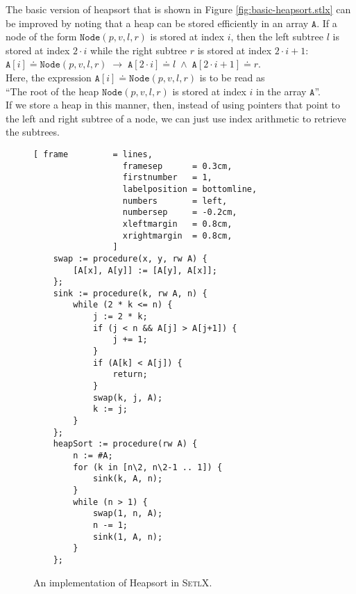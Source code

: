 The basic version of heapsort that is shown in Figure \ref{fig:basic-heapsort.stlx} can be improved
by noting that a heap can be stored efficiently in an array $\texttt{A}$.  If a node of the form
$\texttt{Node}(p, v, l, r)$ is stored at index $i$, then the left subtree $l$ is stored at
index $2 \cdot i$ while the right subtree $r$ is stored at index $2 \cdot i + 1$:
\\[0.2cm]
\hspace*{1.3cm}
$\texttt{A}[i] \doteq \texttt{Node}(p, v, l, r) \;\rightarrow\; \texttt{A}[2\cdot i] \doteq l \;\wedge\; \texttt{A}[2\cdot i+1] \doteq r$.
\\[0.2cm]
Here, the expression $\texttt{A}[i] \doteq \texttt{Node}(p, v, l, r)$ is to be read as 
\\[0.2cm]
\hspace*{1.3cm}
``The root of the heap $\texttt{Node}(p, v, l, r)$ is stored at index $i$ in the array $\texttt{A}$''.
\\[0.2cm]
If we store a heap in this manner, then, instead of using pointers that point to the left and right
subtree of a node, we can just use index arithmetic to retrieve the subtrees.  


 
\begin{figure}[!ht]
\centering
\begin{Verbatim}[ frame         = lines, 
                  framesep      = 0.3cm, 
                  firstnumber   = 1,
                  labelposition = bottomline,
                  numbers       = left,
                  numbersep     = -0.2cm,
                  xleftmargin   = 0.8cm,
                  xrightmargin  = 0.8cm,
                ]
    swap := procedure(x, y, rw A) {
        [A[x], A[y]] := [A[y], A[x]];
    };
    sink := procedure(k, rw A, n) {
        while (2 * k <= n) {
            j := 2 * k;
            if (j < n && A[j] > A[j+1]) {
                j += 1;
            }
            if (A[k] < A[j]) {
                return;
            }
            swap(k, j, A);
            k := j;
        }
    };
    heapSort := procedure(rw A) {
        n := #A;
        for (k in [n\2, n\2-1 .. 1]) {
            sink(k, A, n);
        }
        while (n > 1) {
            swap(1, n, A);
            n -= 1;
            sink(1, A, n);
        }
    };
\end{Verbatim}
\vspace*{-0.3cm}
\caption{An implementation of Heapsort in \textsc{SetlX}.}
\label{fig:heap-sort.stlx}
\end{figure}

